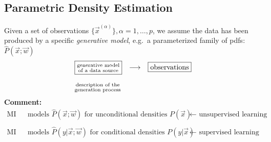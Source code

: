 \subsection{Parametric Density Estimation}
\label{sec:ParametricDensityEstimation}
Given a set of observations $\big\{ \vec{x}^{(\alpha)} \big\}, \alpha = 1, \ldots, p$, we assume the data has been 
produced by a specific \emph{generative model}, e.g.\ a
parameterized family of pdfs: $\widehat{P}(\vec{x};\vec{w})$ 
\[ \begin{array}{lcl}
	\fbox{$ \substack{ \text{generative model} \\ \text{of a data source} 
		} $}
	& \longrightarrow & \fbox{$ \text{observations} $} \\\\
	\substack{ \text{description of the} \\ \text{generation process} }
\end{array} \]
\textbf{Comment:}
\[ \begin{array}{lll}
	\text{MI 2:} & \text{models } \widehat{P}(\vec{x};\vec{w}) \text{ for
		unconditional densities } P(\vec{x}) 
		& \leftarrow \text{ unsupervised learning} \\\\
	\text{MI I:} & \text{models } \widehat{P}(y|\vec{x};\vec{w}) \text{ for
		conditional densities } P(y|\vec{x})
		& \leftarrow \text{ supervised learning}
\end{array} \]
